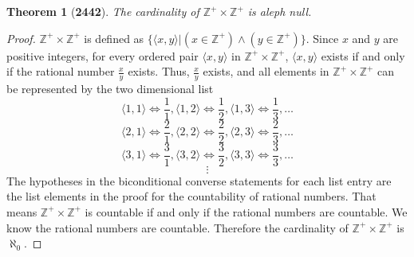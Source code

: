 \documentclass[preview]{standalone}
\newtheorem*{theorem*}{Theorem}
\begin{document}
\begin{theorem*}[\textbf{2442}]
    The cardinality of $\mathbb{Z^{+}} \times \mathbb{Z^{+}}$ is aleph null.
\end{theorem*}

\begin{proof}
    $\mathbb{Z^{+}} \times \mathbb{Z^{+}}$ is defined as 
    $\{ \langle x, y \rangle | (x \in \mathbb{Z^{+}}) \land (y \in \mathbb{Z^{+}})\}$. 
    Since $x$ and $y$ are positive integers, for every ordered pair $\langle x, y \rangle$ in 
    $\mathbb{Z^{+}} \times \mathbb{Z^{+}}$, $\langle x, y \rangle$ exists if and only if the rational number 
    $\frac{x}{y}$ exists. Thus, $\frac{x}{y}$ exists, and all elements in 
    $\mathbb{Z^{+}} \times \mathbb{Z^{+}}$ can be represented by the two dimensional list
    $$\langle 1,1 \rangle \iff \frac{1}{1}, \langle 1,2 \rangle \iff \frac{1}{2}, \langle 1,3 \rangle \iff \frac{1}{3}, \dots$$
    $$\langle 2,1 \rangle \iff \frac{2}{1}, \langle 2,2 \rangle \iff \frac{2}{2}, \langle 2,3 \rangle \iff \frac{2}{3}, \dots$$
    $$\langle 3,1 \rangle \iff \frac{3}{1}, \langle 3,2 \rangle \iff \frac{3}{2}, \langle 3,3 \rangle \iff \frac{3}{3}, \dots$$
    $$\vdots$$
    The hypotheses in the biconditional converse statements for each list entry are the list 
    elements in the proof for the countability of rational numbers. That means 
    $\mathbb{Z^{+}} \times \mathbb{Z^{+}}$ is countable if and only if the rational numbers are 
    countable. We know the rational numbers are countable. Therefore the cardinality of 
    $\mathbb{Z^{+}} \times \mathbb{Z^{+}}$ is $\aleph_0$.
\color{lightgray} \end{proof}
\end{document}
